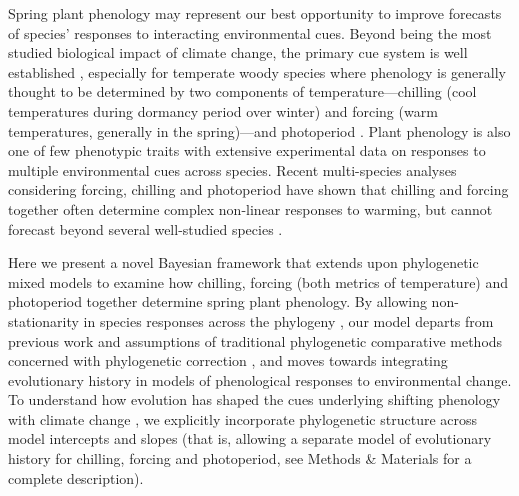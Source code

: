 \documentclass[11pt]{article}
\begin{document}
Spring plant phenology may represent our best opportunity to improve forecasts of species' responses to interacting environmental cues. Beyond being the most studied biological impact of climate change, the primary cue system is well established \citep{chuinearees}, especially for temperate woody species where phenology is generally thought to be determined by two components of temperature---chilling (cool temperatures during dormancy period over winter) and forcing (warm temperatures, generally in the spring)---and photoperiod \citep{ospreephoto}. Plant phenology is also one of few phenotypic traits with extensive experimental data on responses to multiple environmental cues across species. Recent multi-species analyses considering forcing, chilling and photoperiod have shown that chilling and forcing together often determine complex non-linear responses to warming, but cannot forecast beyond several well-studied species \citep{ettinger2020}. %

Here we present a novel Bayesian framework that extends upon phylogenetic mixed models \citep{housworth2004phylogenetic} to examine how chilling, forcing (both metrics of temperature) and photoperiod together determine spring plant phenology. By allowing non-stationarity in species responses across the phylogeny \citep{davies2019phylogenetically}, our model departs from previous work and assumptions of traditional phylogenetic comparative methods concerned with phylogenetic correction \citep[e.g.][]{freckleton2002phylogenetic}, and moves towards integrating evolutionary history in models of phenological responses to environmental change. To understand how evolution has shaped the cues underlying shifting phenology with climate change \citep{uyeda2017evolution}, we explicitly incorporate phylogenetic structure across model intercepts and slopes (that is, allowing a separate model of evolutionary history for chilling, forcing and photoperiod, see Methods \& Materials for a complete description). 
\end{document}
